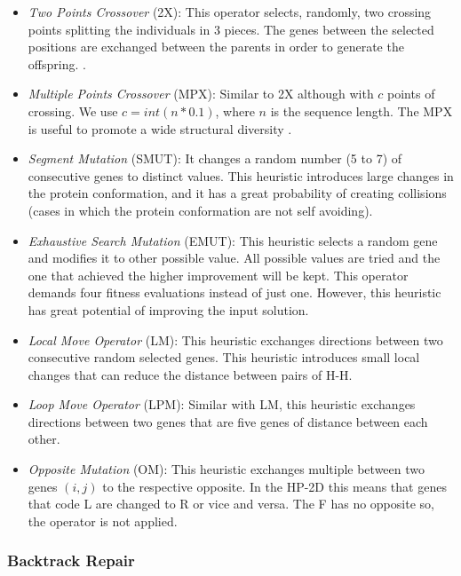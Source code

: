 \documentclass[conference]{IEEEtran}
\begin{document}
  \begin{itemize}
  	\item \textit{Two Points Crossover} (2X): This operator selects, randomly, two crossing points splitting the individuals in 3 pieces. The genes between the selected positions are exchanged between the parents in order to generate the offspring. \cite{benitez2015algoritmo}.
  	
  	
  	\item  \textit{Multiple Points Crossover} (MPX): Similar to 2X although with $c$ points of crossing. We use $c=int(n*0.1)$, where $n$ is the sequence length. The MPX is useful to promote a wide structural diversity \cite{sabar2015automatic}.
  	
	\item \textit{Segment Mutation} (SMUT): It changes a random number (5 to 7) of consecutive genes to distinct values. This heuristic introduces large changes in the protein conformation, and it has a great probability of creating collisions (cases in which the protein conformation are not self avoiding).  

	\item \textit {Exhaustive Search Mutation} (EMUT): 	This heuristic selects a random gene and modifies it to other possible value. All possible values are tried and the one that achieved the higher improvement will be kept. This operator demands four fitness evaluations instead of just one. However, this heuristic has great potential of improving the input solution.
	
	\item \textit{Local Move Operator} (LM): This heuristic exchanges directions between two consecutive random selected genes. This heuristic introduces small local changes that can reduce the distance between pairs of H-H.
	
	\item \textit{Loop Move Operator} (LPM): Similar with LM, this heuristic exchanges directions between two genes that are five genes of distance between each other.
	
	
	\item \textit{Opposite Mutation} (OM): This heuristic exchanges multiple between two genes $(i,j)$ to the respective opposite. In the HP-2D this means that genes that code L are changed to R or vice and versa. The F has no opposite so, the operator is not applied. 

 \end{itemize} 	 
 
 \subsubsection{Backtrack Repair}
\end{document}
